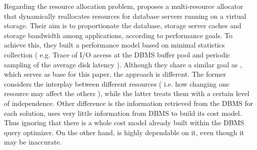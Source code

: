 Regarding the resource allocation problem, \cite{Soundararajan:2009:DRA:1525908.1525914} proposes a multi-resource allocator that dynamically reallocates resources for database servers running on a virtual storage. Their aim is to proportionate the database, storage server caches and storage bandwidth among applications, according to performance goals. To achieve this, they built a performance model based on minimal statistics collection (  e.g. Trace of I/O access at the DBMS buffer pool and periodic sampling of the average disk latency ). Although they share a similar goal as  \cite{Soror:2008:AVM:1376616.1376711}, which serves as base for this paper, the approach is different. The former considers the interplay between different resources ( i.e. how changing one resource may affect the others ), while the latter treats them with a certain level of independence. Other difference is the information retrieved from the DBMS for each solution, \cite{Soundararajan:2009:DRA:1525908.1525914} uses very little information from DBMS to 
build its cost model. Thus ignoring that there is a whole cost model already built within the DBMS query optimizer. On the other hand,\cite{Soror:2008:AVM:1376616.1376711} is highly dependable on it, even though it may be inaccurate.
